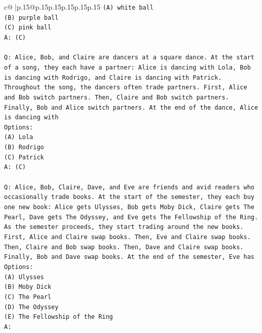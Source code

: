\documentclass{article}
\begin{document}
{\begin{supertabular}{c@{$\;$}|p{.15\linewidth}@{}p{.15\linewidth}p{.15\linewidth}p{.15\linewidth}p{.15\linewidth}p{.15\linewidth}}
{{{\texttt{(A) white ball} \\
\texttt{(B) purple ball} \\
\texttt{(C) pink ball} \\
\texttt{A: (C)} \\
\\ 
\texttt{Q: Alice, Bob, and Claire are dancers at a square dance. At the start of a song, they each have a partner: Alice is dancing with Lola, Bob is dancing with Rodrigo, and Claire is dancing with Patrick.} \\
\texttt{Throughout the song, the dancers often trade partners. First, Alice and Bob switch partners. Then, Claire and Bob switch partners. Finally, Bob and Alice switch partners. At the end of the dance, Alice is dancing with} \\
\texttt{Options:} \\
\texttt{(A) Lola} \\
\texttt{(B) Rodrigo} \\
\texttt{(C) Patrick} \\
\texttt{A: (C)} \\
\\ 
\texttt{Q: Alice, Bob, Claire, Dave, and Eve are friends and avid readers who occasionally trade books. At the start of the semester, they each buy one new book: Alice gets Ulysses, Bob gets Moby Dick, Claire gets The Pearl, Dave gets The Odyssey, and Eve gets The Fellowship of the Ring.} \\
\texttt{As the semester proceeds, they start trading around the new books. First, Alice and Claire swap books. Then, Eve and Claire swap books. Then, Claire and Bob swap books. Then, Dave and Claire swap books. Finally, Bob and Dave swap books. At the end of the semester, Eve has} \\
\texttt{Options:} \\
\texttt{(A) Ulysses} \\
\texttt{(B) Moby Dick} \\
\texttt{(C) The Pearl} \\
\texttt{(D) The Odyssey} \\
\texttt{(E) The Fellowship of the Ring} \\
\texttt{A:} \\
            }
        }
    }
     \\ \\


\end{supertabular}}
\end{document}
